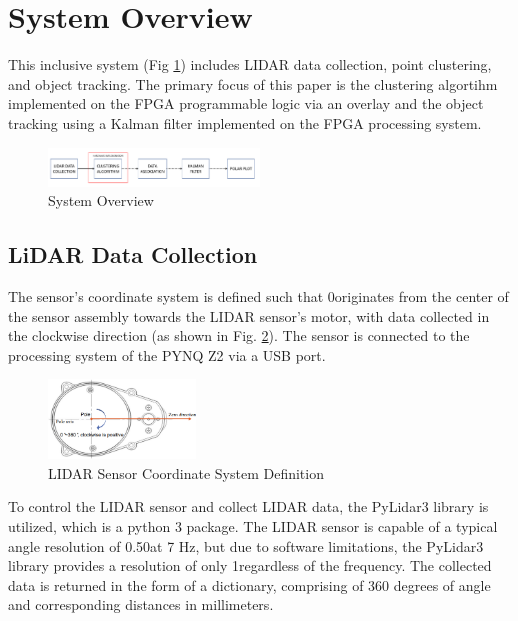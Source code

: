 \documentclass[journal]{IEEEtran} %
\begin{document}
\section{System Overview}
This inclusive system (Fig \ref{fig:sysOverview}) includes LIDAR data collection, point clustering, and object tracking. The primary focus of this paper is the clustering algortihm implemented on the FPGA programmable logic via an overlay and the object tracking using a Kalman filter implemented on the FPGA processing system. 

\begin{figure}[h]
  \centering
  \includegraphics[width=0.5\textwidth]{sysOverview}
  \caption{System Overview}
  \label{fig:sysOverview}
\end{figure}

\subsection{LiDAR Data Collection}

The sensor's coordinate system is defined such that 0\textdegree originates from the center of the sensor assembly towards the LIDAR sensor's motor, with data collected in the clockwise direction (as shown in Fig. \ref{fig:polarLIDAR}). The sensor is connected to the processing system of the PYNQ Z2 via a USB port.

\begin{figure}[h]
  \centering
  \includegraphics[width=0.35\textwidth]{polarLIDAR}
  \caption{LIDAR Sensor Coordinate System Definition}
  \label{fig:polarLIDAR}
\end{figure}

 To control the LIDAR sensor and collect LIDAR data, the PyLidar3 library is utilized, which is a python 3 package. The LIDAR sensor is capable of a typical angle resolution of 0.50\textdegree at 7 Hz, but due to software limitations, the PyLidar3 library provides a resolution of only 1\textdegree regardless of the frequency. The collected data is returned in the form of a dictionary, comprising of 360 degrees of angle and corresponding distances in millimeters.\\
\end{document}
